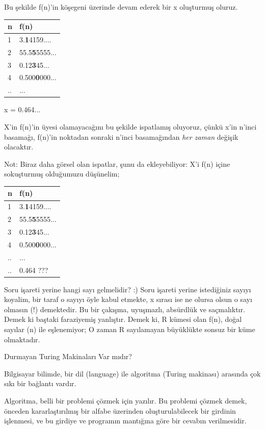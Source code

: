 \documentclass[12pt,fleqn]{article}\usepackage{../../common}
\begin{document}
Bu şekilde f(n)'in köşegeni üzerinde devam ederek bir x oluşturmuş oluruz.

\begin{tabular}{ll}
n & f(n) \\
\hline
1 &  \textrm{ }3.\textbf{1}4159....\\
\hline
2 &  55.5\textbf{5}5555...\\
\hline
3 &  \textrm{ }0.12\textbf{3}45...\\
\hline
4 &  \textrm{ }0.500\textbf{0}000...\\
\hline
.. &  ...
\end{tabular}

x = 0.464...

X'in f(n)'in üyesi olamayacağını bu şekilde ispatlamış oluyoruz, çünkü x'in
n'inci basamağı, f(n)'in noktadan sonraki n'inci basamağından {\em her zaman}
değişik olacaktır.

Not: Biraz daha görsel olan ispatlar, şunu da ekleyebiliyor: X'i f(n) içine
sokuşturmuş olduğumuzu düşünelim;

\begin{tabular}{ll}
n & f(n) \\
\hline
1 &  \textrm{ }3.\textbf{1}4159....\\
\hline
2 &  55.5\textbf{5}5555...\\
\hline
3 &  \textrm{ }0.12\textbf{3}45...\\
\hline
4 &  \textrm{ }0.500\textbf{0}000...\\
\hline
.. &  ... \\
\hline
.. &  0.464 ???
\end{tabular}

Soru işareti yerine hangi sayı gelmelidir? :) Soru işareti yerine
istediğiniz sayıyı koyalim, bir taraf o sayıyı öyle kabul etmekte, x sırası
ise ne olursa olsun o sayı olmasın (!)  demektedir. Bu bir çakışma,
uyuşmazlı, absürdlük ve saçmalıktır. Demek ki baştaki faraziyemiş
yanlıştır. Demek ki, R kümesi olan f(n), doğal sayılar (n) ile eşlenemiyor;
O zaman R sayılamayan büyüklükte sonsuz bir küme olmaktadır.

Durmayan Turing Makinaları Var mıdır?

Bilgisayar bilimde, bir dil (language) ile algoritma (Turing makinası) arasında
çok sıkı bir bağlantı vardır.

Algoritma, belli bir problemi çözmek için yazılır. Bu problemi çözmek
demek, önceden kararlaştırılmış bir alfabe üzerinden oluşturulabilecek bir
girdinin işlenmesi, ve bu girdiye ve programın mantığına göre bir cevabın
verilmesidir.
\end{document}
